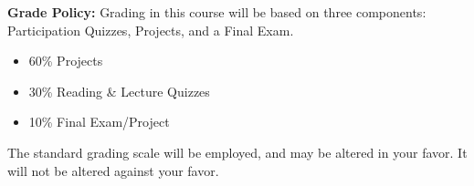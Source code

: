 \vspace*{.25in}
\noindent\textbf{Grade Policy:} 
Grading in this course will be based on three components: Participation Quizzes, Projects, and a Final Exam.
\begin{itemize}
    \item 60\% Projects
    \item 30\% Reading \& Lecture Quizzes
    \item 10\% Final Exam/Project
\end{itemize}
The standard grading scale will be employed, and may be altered in your favor. 
It will not be altered against your favor.